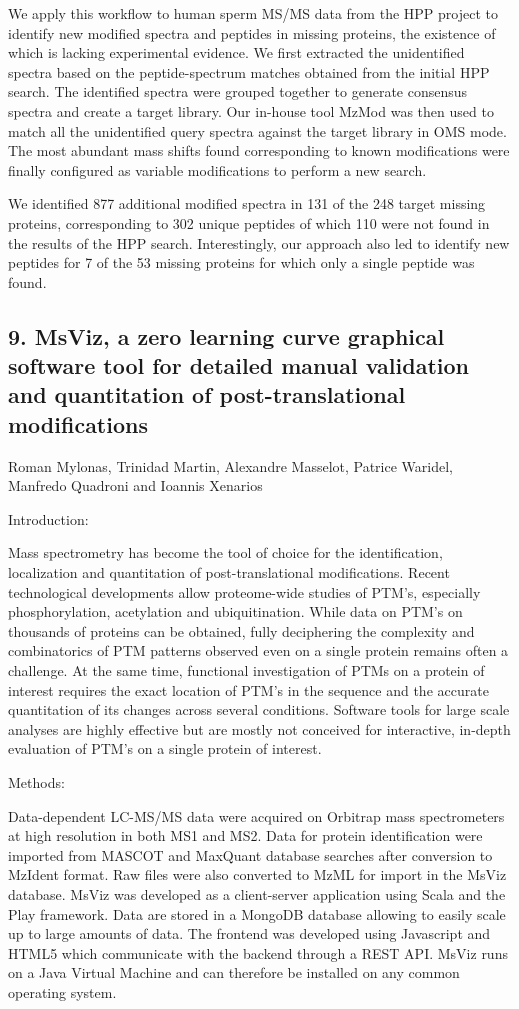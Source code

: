 We apply this workflow to human sperm MS/MS data from the HPP project to identify new modified spectra and peptides in missing proteins, the existence of which is lacking experimental evidence. We first extracted the unidentified spectra based on the peptide-spectrum matches obtained from the initial HPP search. The identified spectra were grouped together to generate consensus spectra and create a target library. Our in-house tool MzMod was then used to match all the unidentified query spectra against the target library in OMS mode. The most abundant mass shifts found corresponding to known modifications were finally configured as variable modifications to perform a new search.

We identified 877 additional modified spectra in 131 of the 248 target missing proteins, corresponding to 302 unique peptides of which 110 were not found in the results of the HPP search. Interestingly, our approach also led to identify new peptides for 7 of the 53 missing proteins for which only a single peptide was found.

\subsection*{\color{eubicRed} 9. MsViz, a zero learning curve graphical software tool for detailed manual validation and quantitation of post-translational modifications}
{\color{eubicGray}Roman Mylonas, Trinidad Martin, Alexandre Masselot, Patrice Waridel, Manfredo Quadroni and Ioannis Xenarios}

Introduction:

Mass spectrometry has become the tool of choice for the identification, localization and quantitation of post-translational modifications. Recent technological developments allow proteome-wide studies of PTM’s, especially phosphorylation, acetylation and ubiquitination. While data on PTM’s on thousands of proteins can be obtained, fully deciphering the complexity and combinatorics of PTM patterns observed even on a single protein remains often a challenge.
At the same time, functional investigation of PTMs on a protein of interest requires the exact location of PTM’s in the sequence and the accurate quantitation of its changes across several conditions. Software tools for large scale analyses are highly effective but are mostly not conceived for interactive, in-depth evaluation of PTM’s on a single protein of interest.


Methods:

Data-dependent LC-MS/MS data were acquired on Orbitrap mass spectrometers at high resolution in both MS1 and MS2. Data for protein identification were imported from MASCOT and MaxQuant database searches after conversion to MzIdent format. Raw files were also converted to MzML for import in the MsViz database. MsViz was developed as a client-server application using Scala and the Play framework. Data are stored in a MongoDB database allowing to easily scale up to large amounts of data. The frontend was developed using Javascript and HTML5 which communicate with the backend through a REST API. MsViz runs on a Java Virtual Machine and can therefore be installed on any common operating system.


